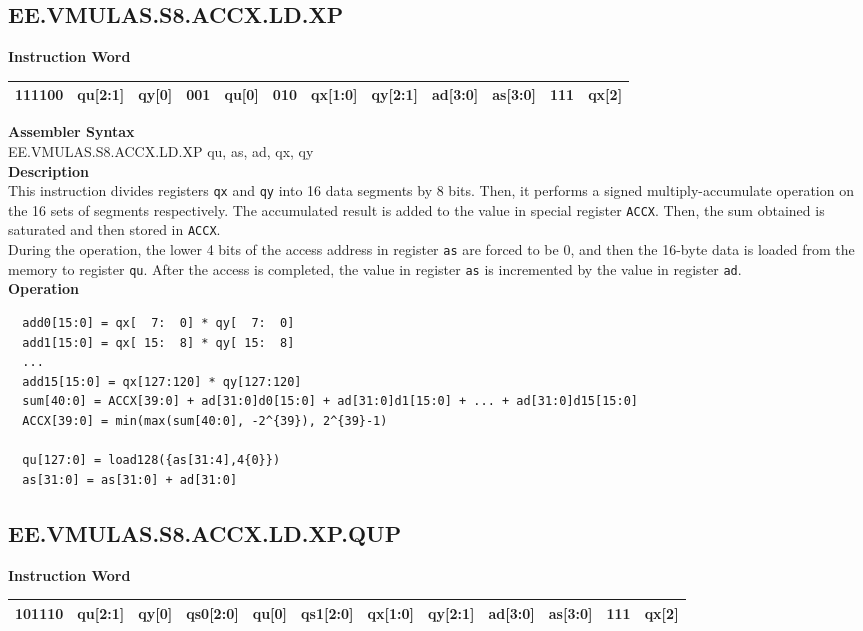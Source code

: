 \clearpage
\subsection{EE.VMULAS.S8.ACCX.LD.XP}\label{instruction:EEVMULASS8ACCXLDXP}
\setlength\tabcolsep{6pt}
\textbf{Instruction Word} \\
\begin{tabular}{|c|c|c|c|c|c|c|c|c|c|c|c|}
	\hline
	111100 & qu[2:1] & qy[0] & 001 & qu[0] & 010 & qx[1:0] & qy[2:1] & ad[3:0] & as[3:0] & 111 & qx[2] \\
	\hline
\end{tabular}

\textbf{Assembler Syntax} \\
EE.VMULAS.S8.ACCX.LD.XP qu, as, ad, qx, qy \\
\textbf{Description} \\
This instruction divides registers \lstinline{qx} and \lstinline{qy} into 16 data segments by 8 bits. Then, it performs a signed multiply-accumulate operation on the 16 sets of segments respectively. The accumulated result is added to the value in special register \lstinline{ACCX}. Then, the sum obtained is saturated and then stored in \lstinline{ACCX}.\\
During the operation, the lower 4 bits of the access address in register \lstinline{as} are forced to be 0, and then the 16-byte data is loaded from the memory to register \lstinline{qu}. After the access is completed, the value in register \lstinline{as} is incremented by the value in register \lstinline{ad}.\\
\textbf{Operation}
\begin{lstlisting}
  add0[15:0] = qx[  7:  0] * qy[  7:  0]
  add1[15:0] = qx[ 15:  8] * qy[ 15:  8]
  ...
  add15[15:0] = qx[127:120] * qy[127:120]
  sum[40:0] = ACCX[39:0] + ad[31:0]d0[15:0] + ad[31:0]d1[15:0] + ... + ad[31:0]d15[15:0]
  ACCX[39:0] = min(max(sum[40:0], -2^{39}), 2^{39}-1)

  qu[127:0] = load128({as[31:4],4{0}})
  as[31:0] = as[31:0] + ad[31:0]
\end{lstlisting}

\clearpage
\subsection{EE.VMULAS.S8.ACCX.LD.XP.QUP}\label{instruction:EEVMULASS8ACCXLDXPQUP}
\setlength\tabcolsep{6pt}
\textbf{Instruction Word} \\
\begin{tabular}{|c|c|c|c|c|c|c|c|c|c|c|c|}
	\hline
	101110 & qu[2:1] & qy[0] & qs0[2:0] & qu[0] & qs1[2:0] & qx[1:0] & qy[2:1] & ad[3:0] & as[3:0] & 111 & qx[2] \\
	\hline
\end{tabular}

